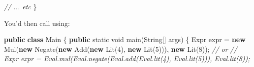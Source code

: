 \documentclass[]{article}
\newenvironment{Shaded}{}{}
\newcommand{\BuiltInTok}[1]{\textcolor[rgb]{0.00,0.50,0.00}{#1}}
\newcommand{\CommentTok}[1]{\textcolor[rgb]{0.38,0.63,0.69}{\textit{#1}}}
\newcommand{\DataTypeTok}[1]{\textcolor[rgb]{0.56,0.13,0.00}{#1}}
\newcommand{\DecValTok}[1]{\textcolor[rgb]{0.25,0.63,0.44}{#1}}
\newcommand{\FunctionTok}[1]{\textcolor[rgb]{0.02,0.16,0.49}{#1}}
\newcommand{\KeywordTok}[1]{\textcolor[rgb]{0.00,0.44,0.13}{\textbf{#1}}}
\newcommand{\NormalTok}[1]{#1}
\newcommand{\OperatorTok}[1]{\textcolor[rgb]{0.40,0.40,0.40}{#1}}
\begin{document}
\begin{Shaded}
\begin{Highlighting}[]
    \CommentTok{// ... etc}
\OperatorTok{\}}
\end{Highlighting}
\end{Shaded}

You'd then call using:

\begin{Shaded}
\begin{Highlighting}[]
\KeywordTok{public} \KeywordTok{class}\NormalTok{ Main }\OperatorTok{\{}
    \KeywordTok{public} \DataTypeTok{static} \DataTypeTok{void} \FunctionTok{main}\OperatorTok{(}\BuiltInTok{String}\OperatorTok{[]}\NormalTok{ args}\OperatorTok{)} \OperatorTok{\{}
\NormalTok{        Expr expr }\OperatorTok{=} \KeywordTok{new} \FunctionTok{Mul}\OperatorTok{(}\KeywordTok{new} \FunctionTok{Negate}\OperatorTok{(}\KeywordTok{new} \FunctionTok{Add}\OperatorTok{(}\KeywordTok{new} \FunctionTok{Lit}\OperatorTok{(}\DecValTok{4}\OperatorTok{),} \KeywordTok{new} \FunctionTok{Lit}\OperatorTok{(}\DecValTok{5}\OperatorTok{))),} \KeywordTok{new} \FunctionTok{Lit}\OperatorTok{(}\DecValTok{8}\OperatorTok{));}
        \CommentTok{// or}
        \CommentTok{// Expr expr = Eval.mul(Eval.negate(Eval.add(Eval.lit(4), Eval.lit(5))), Eval.lit(8));}


\end{Highlighting}
\end{Shaded}
\end{document}
